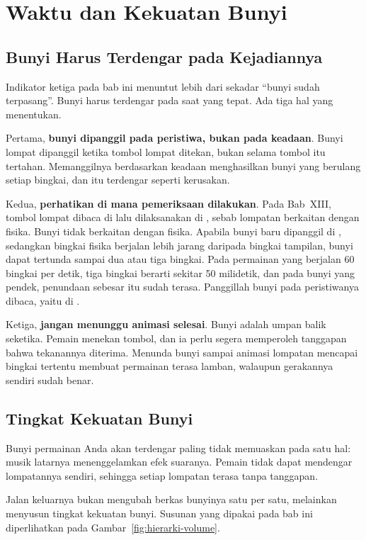 \section{Waktu dan Kekuatan Bunyi}
\label{sec:waktu-volume}

\subsection{Bunyi Harus Terdengar pada Kejadiannya}

Indikator ketiga pada bab ini menuntut lebih dari sekadar ``bunyi sudah
terpasang''. Bunyi harus terdengar pada saat yang tepat. Ada tiga hal yang
menentukan.

Pertama, \textbf{bunyi dipanggil pada peristiwa, bukan pada keadaan}. Bunyi
lompat dipanggil ketika tombol lompat ditekan, bukan selama tombol itu
tertahan. Memanggilnya berdasarkan keadaan menghasilkan bunyi yang berulang
setiap bingkai, dan itu terdengar seperti kerusakan.

Kedua, \textbf{perhatikan di mana pemeriksaan dilakukan}. Pada Bab~XIII, tombol
lompat dibaca di  lalu dilaksanakan di , sebab
lompatan berkaitan dengan fisika. Bunyi tidak berkaitan dengan fisika. Apabila
bunyi baru dipanggil di , sedangkan bingkai fisika berjalan
lebih jarang daripada bingkai tampilan, bunyi dapat tertunda sampai dua atau
tiga bingkai. Pada permainan yang berjalan 60 bingkai per detik, tiga bingkai
berarti sekitar 50 milidetik, dan pada bunyi yang pendek, penundaan sebesar itu
sudah terasa. Panggillah bunyi pada peristiwanya dibaca, yaitu di
.

Ketiga, \textbf{jangan menunggu animasi selesai}. Bunyi adalah umpan balik
seketika. Pemain menekan tombol, dan ia perlu segera memperoleh tanggapan bahwa
tekanannya diterima. Menunda bunyi sampai animasi lompatan mencapai bingkai
tertentu membuat permainan terasa lamban, walaupun gerakannya sendiri sudah
benar.

\subsection{Tingkat Kekuatan Bunyi}

Bunyi permainan Anda akan terdengar paling tidak memuaskan pada satu hal:
musik latarnya menenggelamkan efek suaranya. Pemain tidak dapat mendengar
lompatannya sendiri, sehingga setiap lompatan terasa tanpa tanggapan.

Jalan keluarnya bukan mengubah berkas bunyinya satu per satu, melainkan menyusun
tingkat kekuatan bunyi. Susunan yang dipakai pada bab ini diperlihatkan pada
Gambar~\ref{fig:hierarki-volume}.

